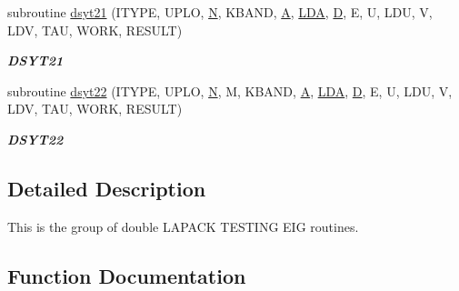\begin{DoxyCompactItemize}
subroutine \hyperlink{group__double__eig_gaf6ec778bf025e73e4c067632270cd5e2}{dsyt21} (I\+T\+Y\+P\+E, U\+P\+L\+O, \hyperlink{polmisc_8c_a0240ac851181b84ac374872dc5434ee4}{N}, K\+B\+A\+N\+D, \hyperlink{classA}{A}, \hyperlink{example__user_8c_ae946da542ce0db94dced19b2ecefd1aa}{L\+D\+A}, \hyperlink{odrpack_8h_a7dae6ea403d00f3687f24a874e67d139}{D}, E, U, L\+D\+U, V, L\+D\+V, T\+A\+U, W\+O\+R\+K, R\+E\+S\+U\+L\+T)
\begin{DoxyCompactList}\small\item\em {\bfseries D\+S\+Y\+T21} \end{DoxyCompactList}\item 
subroutine \hyperlink{group__double__eig_gaa55d41534d46929dbd30b8abc36f11b6}{dsyt22} (I\+T\+Y\+P\+E, U\+P\+L\+O, \hyperlink{polmisc_8c_a0240ac851181b84ac374872dc5434ee4}{N}, M, K\+B\+A\+N\+D, \hyperlink{classA}{A}, \hyperlink{example__user_8c_ae946da542ce0db94dced19b2ecefd1aa}{L\+D\+A}, \hyperlink{odrpack_8h_a7dae6ea403d00f3687f24a874e67d139}{D}, E, U, L\+D\+U, V, L\+D\+V, T\+A\+U, W\+O\+R\+K, R\+E\+S\+U\+L\+T)
\begin{DoxyCompactList}\small\item\em {\bfseries D\+S\+Y\+T22} \end{DoxyCompactList}\end{DoxyCompactItemize}


\subsection{Detailed Description}
This is the group of double L\+A\+P\+A\+C\+K T\+E\+S\+T\+I\+N\+G E\+I\+G routines. 

\subsection{Function Documentation}
\hypertarget{group__double__eig_ga4281d345e520762c2b713861a36db678}{}
